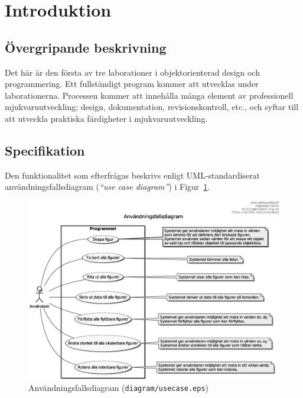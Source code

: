 %
%

\section*{Introduktion}\label{sec:intro}

\subsection*{Övergripande beskrivning}\label{sec:beskrivning}
Det här är den första av tre laborationer i objektorienterad design och
programmering. Ett fullständigt program kommer att utvecklas under
laborationerna. Processen kommer att innehålla många element av professionell
mjukvaruutveckling; design, dokumentation, revisionskontroll, etc., och syftar
till att utveckla praktiska färdigheter i mjukvaruutveckling.

\subsection*{Specifikation}
Den funktionalitet som efterfrågas beskrivs enligt UML-standardiserat
användningsfallsdiagram (\emph{``use case diagram''}) i Figur~\ref{fig:usecase}.

\begin{figure}[htbp]
\centering
\includegraphics[width=\linewidth]{diagram/usecase.eps}
\caption{Användningsfallsdiagram (\texttt{diagram/usecase.eps})}
\label{fig:usecase}
\end{figure}


